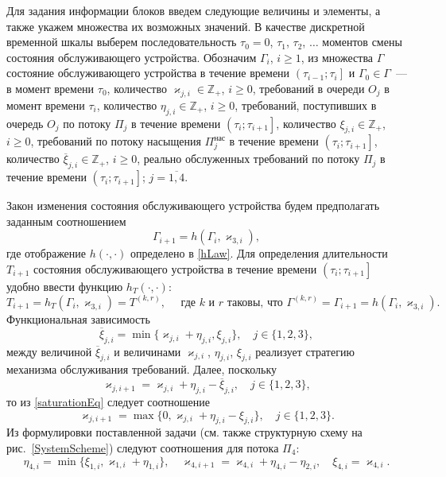 \documentclass[a4paper,12pt,russian]{extarticle}
\begin{document}
Для задания информации блоков введем следующие величины и элементы, а также укажем множества их возможных значений. В качестве дискретной временной шкалы выберем последовательность $\tau_0=0$, $\tau_1$, $\tau_2$, $\ldots$ моментов смены состояния обслуживающего устройства. Обозначим $\Gamma_i$, $i\geqslant 1$, из множества $\Gamma$ состояние обслуживающего устройства в течение времени $\left(\tau_{i-1};\tau_i\right]$ и $\Gamma_0\in \Gamma$~--- в момент времени $\tau_0$, количество $\varkappa_{j,i} \in \mathbb{Z}_+ $, $i\geqslant 0$, требований в очереди $O_j$ в момент времени $\tau_i$, количество $\eta_{j,i} \in \mathbb{Z}_+$, $i\geqslant 0$, требований, поступивших в очередь $O_j$ по потоку $\Pi_j$ в течение времени $\left(\tau_{i};\tau_{i+1}\right]$, количество $\xi_{j,i} \in \mathbb{Z}_+$, $i\geqslant 0$, требований по потоку насыщения $\Pi^{\mathrm{\text{нас}}}_j$ в течение времени $\left(\tau_{i};\tau_{i+1}\right]$, количество $\overline{\xi}_{j,i}\in \mathbb{Z}_+$, $i\geqslant 0$, реально обслуженных требований по потоку $\Pi_j$ в течение времени $\left(\tau_{i};\tau_{i+1}\right]$; $j=\overline{1,4}$.

Закон изменения состояния обслуживающего устройства будем предполагать заданным соотношением 
\begin{equation}
\Gamma_{i+1}=h(\Gamma_i,\varkappa_{3,i}),
\label{gammaFunc}
\end{equation}
где отображение $h(\cdot,\cdot)$ определено в \eqref{hLaw}.
Для определения длительности $T_{i+1}$ состояния обслуживающего устройства в течение времени $\left(\tau_{i};\tau_{i+1}\right]$ удобно ввести функцию $h_T(\cdot,\cdot)$:
\begin{equation*}
T_{i+1}=h_T(\Gamma_i,\varkappa_{3,i})= T^{(k,r)},\quad  \text{ где $k$ и $r$ таковы, что } \Gamma^{(k,r)}=\Gamma_{i+1}=h(\Gamma_i,\varkappa_{3,i}).
\end{equation*}
Функциональная зависимость
\begin{equation}
\overline{\xi}_{j,i}=\min\{\varkappa_{j,i}+\eta_{j,i},\xi_{j,i}\}, \quad j\in \{1,2,3\},
\label{saturationEq}
\end{equation}
между величиной $\overline{\xi}_{j,i}$ и величинами $\varkappa_{j,i}$, $\eta_{j,i}$, $\xi_{j,i}$ реализует стратегию механизма обслуживания требований. Далее, поскольку 
\begin{equation*}
\varkappa_{j,i+1}=\varkappa_{j,i}+\eta_{j,i}-\overline{\xi}_{j,i}, \quad  j\in \{1,2,3\},
\end{equation*}
то из \eqref{saturationEq} следует соотношение
\begin{equation}
\varkappa_{j,i+1}=\max\{{0,\varkappa_{j,i}+\eta_{j,i}-\xi_{j,i}}\}, \quad j\in \{1,2,3\}.
\label{queuesFunc}
\end{equation}
Из формулировки поставленной задачи (см. также структурную схему на рис.~\ref{SystemScheme}) следуют соотношения для потока $\Pi_4$:
\begin{equation}
\eta_{4,i} = \min\{\xi_{1,i}, \varkappa_{1,i}+\eta_{1,i}\}, \quad \varkappa_{4,i+1}=\varkappa_{4,i}+\eta_{4,i}-\eta_{2,i}, \quad \xi_{4,i} = \varkappa_{4,i}.
\label{FourthFunc}
\end{equation}
\end{document}
